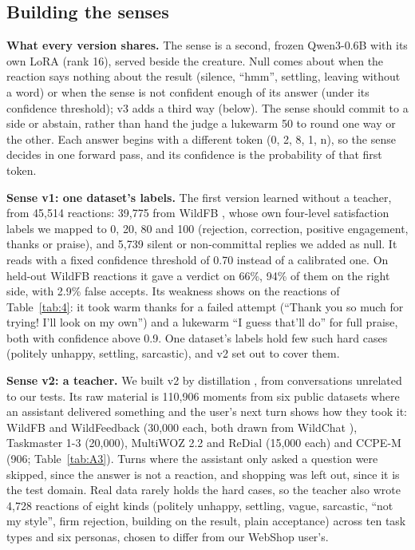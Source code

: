 \subsection{Building the senses}

\textbf{What every version shares.} The sense is a second, frozen Qwen3-0.6B with its own LoRA (rank 16), served beside the creature. Null comes about when the reaction says nothing about the result (silence, ``hmm'', settling, leaving without a word) or when the sense is not confident enough of its answer (under its confidence threshold); v3 adds a third way (below). The sense should commit to a side or abstain, rather than hand the judge a lukewarm 50 to round one way or the other. Each answer begins with a different token (0, 2, 8, 1, n), so the sense decides in one forward pass, and its confidence is the probability of that first token.

\textbf{Sense v1: one dataset's labels.} The first version learned without a teacher, from 45,514 reactions: 39,775 from WildFB \cite{peng2026wildreward}, whose own four-level satisfaction labels we mapped to 0, 20, 80 and 100 (rejection, correction, positive engagement, thanks or praise), and 5,739 silent or non-committal replies we added as null. It reads with a fixed confidence threshold of 0.70 instead of a calibrated one. On held-out WildFB reactions it gave a verdict on 66\%, 94\% of them on the right side, with 2.9\% false accepts. Its weakness shows on the reactions of Table~\ref{tab:4}: it took warm thanks for a failed attempt (``Thank you so much for trying! I'll look on my own'') and a lukewarm ``I guess that'll do'' for full praise, both with confidence above 0.9. One dataset's labels hold few such hard cases (politely unhappy, settling, sarcastic), and v2 set out to cover them.

\textbf{Sense v2: a teacher.} We built v2 by distillation \cite{hinton2015distilling}, from conversations unrelated to our tests. Its raw material is 110,906 moments from six public datasets where an assistant delivered something and the user's next turn shows how they took it: WildFB \cite{peng2026wildreward} and WildFeedback \cite{shi2026wildfeedback} (30,000 each, both drawn from WildChat \cite{zhao2024wildchat}), Taskmaster 1-3 \cite{byrne2019taskmaster} (20,000), MultiWOZ 2.2 \cite{zang2020multiwoz} and ReDial \cite{li2018redial} (15,000 each) and CCPE-M \cite{radlinski2019ccpe} (906; Table~\ref{tab:A3}). Turns where the assistant only asked a question were skipped, since the answer is not a reaction, and shopping was left out, since it is the test domain. Real data rarely holds the hard cases, so the teacher also wrote 4,728 reactions of eight kinds (politely unhappy, settling, vague, sarcastic, ``not my style'', firm rejection, building on the result, plain acceptance) across ten task types and six personas, chosen to differ from our WebShop user's.

